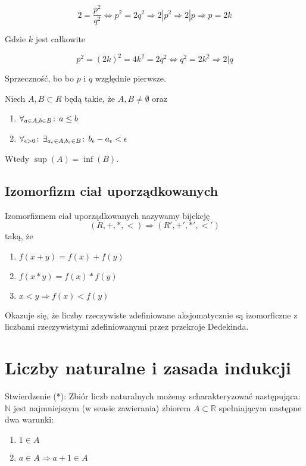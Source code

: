 \documentclass[9pt]{article}
\begin{document}
\[
    2 = \frac{p^2}{q^2} \iff p^2 = 2q^2 \Rightarrow 2 | p^2 \Rightarrow 2|p \Rightarrow p=2k
\]

Gdzie $k$ jest całkowite

\[
    p^2 = (2k)^2 = 4k^2 = 2q^2 \iff q^2 = 2k^2 \Rightarrow 2 | q
\]

Sprzeczność, bo bo $p$ i $q$ względnie pierwsze.

\begin{Twi}
    Niech $A, B \subset R$ będą takie, że $A, B \ne \emptyset$ oraz
    \begin{enumerate}
        \item $\forall_{a \in A, b \in B} \! : \, a \le b$
        \item $\forall_{\epsilon > 0} \! : \, \exists_{a_\epsilon \in A, b_\epsilon \in B} \! : \, b_\epsilon - a_\epsilon <
            \epsilon$
    \end{enumerate}
    Wtedy $\sup(A) = \inf(B)$.
\end{Twi}

\subsection*{Izomorfizm ciał uporządkowanych}

Izomorfizmem ciał uporządkowanych nazywamy bijekcję 
\[
    (R, +, *, <) \Rightarrow (R', +', *', <')
\]
taką, że

\begin{enumerate}
    \item $f(x+y) = f(x)+f(y)$
    \item $f(x*y) = f(x)*f(y)$
    \item $x < y \Rightarrow f(x) < f(y)$
\end{enumerate}

Okazuje się, że liczby rzeczywiste zdefiniowane aksjomatycznie są izomorficzne z liczbami
rzeczywistymi zdefiniowanymi przez przekroje Dedekinda.

\section{Liczby naturalne i zasada indukcji}

Stwierdzenie (*): Zbiór liczb naturalnych możemy scharakteryzować następująca: $\mathbb{N}$ jest
najmniejszym (w sensie zawierania) zbiorem $A \subset \mathbb{R}$ spełniającym następne dwa warunki:

\begin{enumerate}
    \item $1 \in A$
    \item $a \in A \Rightarrow a+1 \in A$
\end{enumerate}
\end{document}
